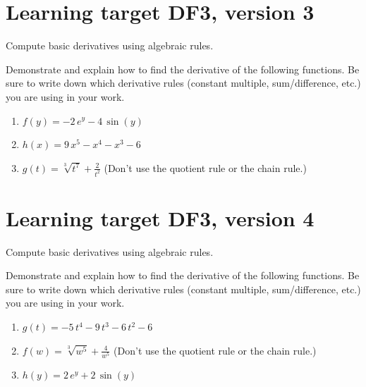 \pagebreak

\section{Learning target DF3, version 3}

Compute basic derivatives using algebraic rules.

\hrulefill

Demonstrate and explain how to find the derivative of the following functions. Be sure to write down which derivative rules (constant multiple, sum/difference, etc.) you are using in your work.

\begin{enumerate}
    \item \(f(y) = -2 \, e^{y} - 4 \, \sin\left(y\right)\) 
    \vfill
    \item \(h(x) = 9 \, x^{5} - x^{4} - x^{3} - 6\) 
    \vfill
    \item \(g(t) = \sqrt[3]{t^7} + \frac{2}{t^{2}}\)  \quad (Don't use the quotient rule or the chain rule.)
    \vfill
\end{enumerate}

\pagebreak

\section{Learning target DF3, version 4}

Compute basic derivatives using algebraic rules.

\hrulefill

Demonstrate and explain how to find the derivative of the following functions. Be sure to write down which derivative rules (constant multiple, sum/difference, etc.) you are using in your work.

\begin{enumerate}
    \item \(g(t) = -5 \, t^{4} - 9 \, t^{3} - 6 \, t^{2} - 6\)
    \vfill
    \item \(f(w) = \sqrt[3]{w^5} + \frac{4}{w^{5}}\)  \quad (Don't use the quotient rule or the chain rule.)
    \vfill
    \item \(h(y) = 2 \, e^{y} + 2 \, \sin\left(y\right)\)
    \vfill
\end{enumerate}

\pagebreak

